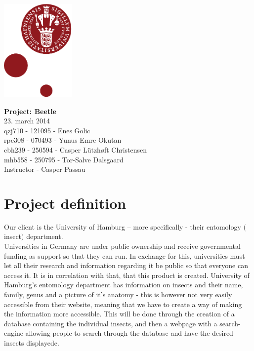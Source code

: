 \documentclass[12pt,a4paper]{article}
\begin{document}
	
	\begin{minipage}[b]{1.0\linewidth} 
				\includegraphics[height=50mm]{KULogo.pdf}
		
		\vspace*{-16ex}
		\vspace {35ex}
		\begin{center}
			{\huge \bf Project: Beetle} \vspace*{4ex} \\
			{\large 23. march 2014}\\
			\vspace*{2ex}
			qzj710 - 121095 - Enes Golic \\
			rpc308 - 070493 - Yunus Emre Okutan \\
			cbh239 - 250594 - Casper Lützhøft Christensen \\
			mhb558 - 250795 - Tor-Salve Dalsgaard\\
			\vspace*{1ex}
			Instructor - Casper Passau
			
		\end{center}
	\end{minipage}
	
\newpage
\tableofcontents

\newpage
\section{Project definition}
Our client is the University of Hamburg – more specifically - their entomology $($insect$)$ department.\\
Universities in Germany are under public ownership and receive governmental funding as support so that they can run.
In exchange for this, universities must let all their research and information regarding it be public so that everyone can access it.
It is in correlation with that, that this product is created.
University of Hamburg's entomology department has information on insects and their name, family, genus and a picture of it's anatomy - this is however not very easily accessible from their website, meaning that we have to create a way of making the information more accessible.
This will be done through the creation of a database containing the individual insects, and then a webpage with a search-engine allowing people to search through the database and have the desired insects displayede.
 
\end{document}
